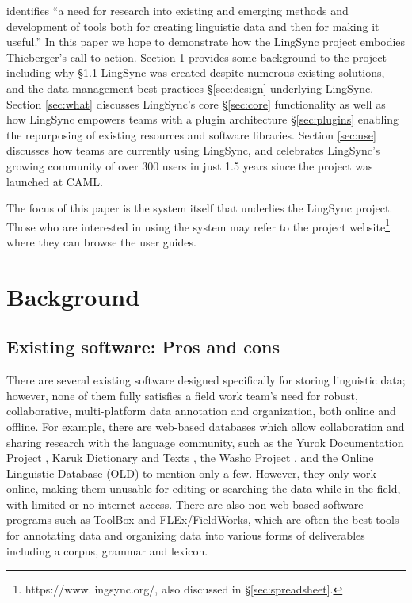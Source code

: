 \documentclass[letterpaper, 12pt, dvips]{mitwpl}
\begin{document}
\cite{Thieberger:2012} identifies ``a need for research into existing and emerging methods and development of tools both for creating linguistic data and then for making it useful.'' 
In this paper we hope to demonstrate how the LingSync project embodies Thieberger's call to action. Section \ref{sec:background} provides some background to the project including why \S \ref{sec:why} LingSync was created despite numerous existing solutions, and the data management best practices \S \ref{sec:design} underlying LingSync. 
Section \ref{sec:what} discusses LingSync's core \S \ref{sec:core} functionality as well as how LingSync empowers teams  with a plugin architecture \S  \ref{sec:plugins} enabling the  repurposing of existing resources and software libraries. Section \ref{sec:use} discusses how teams are currently using LingSync, and celebrates LingSync's  growing community of over 300 users in just 1.5 years since the project was launched at CAML. 

The focus of this paper is the system itself that underlies the LingSync project. Those who are interested in using the system may refer to the project website\footnote{https://www.lingsync.org/, also discussed in \S\ref{sec:spreadsheet}.} where they can browse the user guides. 


\section{Background}
\label{sec:background}



\subsection{Existing software: Pros and cons}
\label{sec:why}


There are several existing software designed specifically for storing linguistic data; however,
none of them fully satisfies a field work team's need for robust,
collaborative,
multi-platform data annotation and organization,
both online and offline.
For example,
there are web-based databases which allow collaboration and sharing research with the language community,
such as 
the Yurok Documentation Project \citep{Yurok:2001:Online},
 Karuk Dictionary and Texts \citep{Karuk:2009:Online},
the Washo Project \citep{Washo:2005:Online, WashoMobile:2008:Online, Cihlar:2008}, 
and the Online Linguistic Database (OLD) \citep{OLD:2010:Online} to mention only a few. 
However, they only work online,
making them unusable for editing or searching the data while in the field, with limited or no internet access.
There are also non-web-based software programs such as ToolBox \citep{ToolBox:2003:Online} 
and FLEx/FieldWorks,
\citep{FLEx:2011:Online}
which are often the best tools for annotating
data and organizing data into various forms of deliverables  
including a corpus,
grammar and lexicon.
\end{document}
